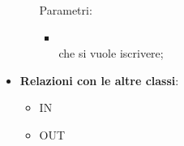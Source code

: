 \begin{itemize}
\begin{itemize}
		Parametri:
		\begin{itemize}
			\item {} \\
			 che si vuole iscrivere;
		\end{itemize}
	\end{itemize}
	\item \textbf{Relazioni con le altre classi}:
	\begin{itemize}
		\item IN \hyperlink{<<interface>> MembersDAO_label}{}
		\item OUT \hyperlink{MemberObserver_label}{}
	\end{itemize}
\end{itemize}
\FloatBarrier


